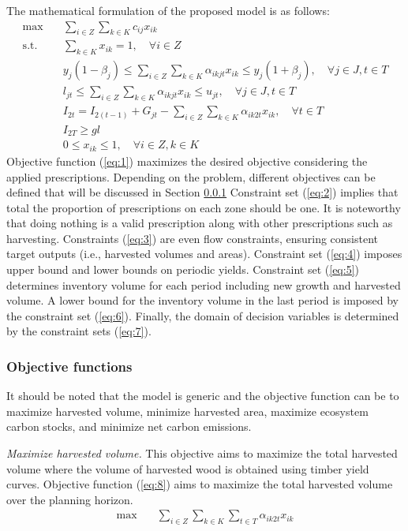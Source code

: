 \documentclass[preprint,12pt]{elsarticle}
\begin{document}
The mathematical formulation of the proposed model is as follows:
\begin{align}
\text{max} & \quad \sum_{i \in Z} \sum_{k \in K} c_{ij} x_{ik} \label{eq:1} \\
\text{s.t.} & \quad \sum_{k \in K} x_{ik} = 1, \quad \forall i \in Z \label{eq:2} \\
& \quad y_{j} (1 - \beta_j) \leq \sum_{i \in Z} \sum_{k \in K} \alpha_{ikjt} x_{ik} \leq y_{j} (1 + \beta_j), \quad \forall j \in J, t \in T \label{eq:3} \\
& \quad l_{jt} \leq \sum_{i \in Z} \sum_{k \in K} \alpha_{ikjt} x_{ik} \leq u_{jt}, \quad \forall j \in J, t \in T \label{eq:4} \\
& \quad I_{2t} = I_{2(t-1)} + G_{jt} - \sum_{i \in Z} \sum_{k \in K} \alpha_{ik2t} x_{ik}, \quad \forall t \in T \label{eq:5} \\
& \quad I_{2T} \geq gl \label{eq:6} \\
& \quad 0 \leq x_{ik} \leq 1, \quad \forall i \in Z, k \in K \label{eq:7}
\end{align}
Objective function (\ref{eq:1}) maximizes the desired objective considering the applied prescriptions. Depending on the problem, different objectives can be defined that will be discussed in Section \ref{sec: Objective functions} Constraint set (\ref{eq:2}) implies that total the proportion of prescriptions on each zone should be one. It is noteworthy that doing nothing is a valid prescription along with other prescriptions such as harvesting. Constraints (\ref{eq:3}) are even flow constraints, ensuring consistent target outputs (i.e., harvested volumes and areas). Constraint set (\ref{eq:4}) imposes upper bound and lower bounds on periodic yields. Constraint set (\ref{eq:5}) determines inventory volume for each period including new growth and harvested volume. A lower bound for the inventory volume in the last period is imposed by the constraint set (\ref{eq:6}). Finally, the domain of decision variables is determined by the constraint sets (\ref{eq:7}).

\subsubsection{Objective functions}
\label{sec: Objective functions}
It should be noted that the model is generic and the objective function can be to maximize harvested volume, minimize harvested area, maximize ecosystem carbon stocks, and minimize net carbon emissions.

\emph{Maximize harvested volume.}
This objective aims to maximize the total harvested volume  where the volume of harvested wood is obtained using timber yield curves. Objective function (\ref{eq:8}) aims to maximize the total harvested volume over the planning horizon.
\begin{align}
       \text{max} & \quad \sum_{i \in Z} \sum_{k \in K} \sum_{t \in T} \alpha_{ik2t} x_{ik} \label{eq:8} 
\end{align}
\end{document}
